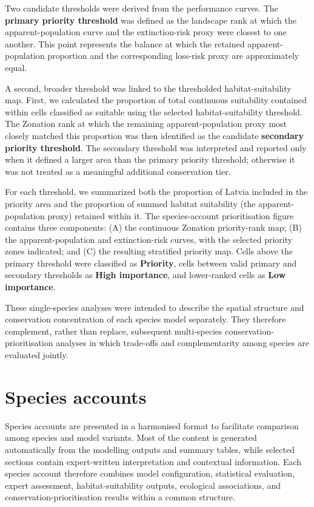 \documentclass[
  openany]{book}
\begin{document}
Two candidate thresholds were derived from the performance curves. The \textbf{primary priority threshold} was defined as the landscape rank at which the apparent-population curve and the extinction-risk proxy were closest to one another. This point represents the balance at which the retained apparent-population proportion and the corresponding loss-risk proxy are approximately equal.

A second, broader threshold was linked to the thresholded habitat-suitability map. First, we calculated the proportion of total continuous suitability contained within cells classified as suitable using the selected habitat-suitability threshold. The Zonation rank at which the remaining apparent-population proxy most closely matched this proportion was then identified as the candidate \textbf{secondary priority threshold}. The secondary threshold was interpreted and reported only when it defined a larger area than the primary priority threshold; otherwise it was not treated as a meaningful additional conservation tier.

For each threshold, we summarized both the proportion of Latvia included in the priority area and the proportion of summed habitat suitability (the apparent-population proxy) retained within it. The species-account prioritisation figure contains three components: (A) the continuous Zonation priority-rank map; (B) the apparent-population and extinction-risk curves, with the selected priority zones indicated; and (C) the resulting stratified priority map. Cells above the primary threshold were classified as \textbf{Priority}, cells between valid primary and secondary thresholds as \textbf{High importance}, and lower-ranked cells as \textbf{Low importance}.

These single-species analyses were intended to describe the spatial structure and conservation concentration of each species model separately. They therefore complement, rather than replace, subsequent multi-species conservation-prioritisation analyses in which trade-offs and complementarity among species are evaluated jointly.

\chapter{Species accounts}\label{species-accounts}

Species accounts are presented in a harmonised format to facilitate comparison
among species and model variants. Most of the content is generated automatically
from the modelling outputs and summary tables, while selected sections contain
expert-written interpretation and contextual information. Each species account
therefore combines model configuration, statistical evaluation, expert assessment,
habitat-suitability outputs, ecological associations, and conservation-prioritisation
results within a common structure.
\end{document}

